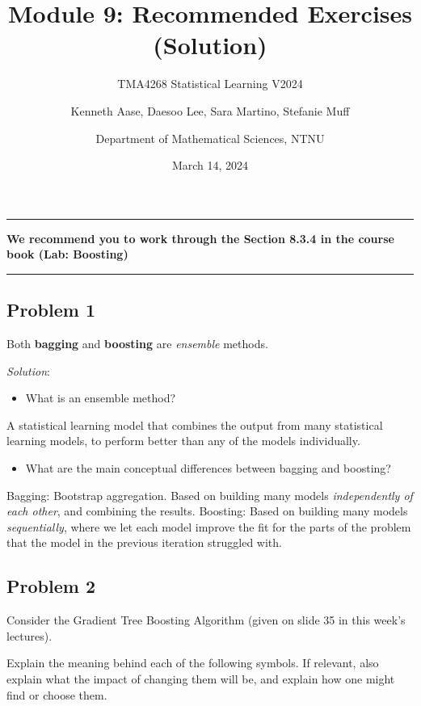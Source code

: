 \documentclass[
]{article}
\title{Module 9: Recommended Exercises (Solution)}
\subtitle{TMA4268 Statistical Learning V2024}
\author{Kenneth Aase, Daesoo Lee, Sara Martino, Stefanie
Muff \and Department of Mathematical Sciences, NTNU}
\date{March 14, 2024}
\providecommand{\tightlist}{%
  \setlength{\itemsep}{0pt}\setlength{\parskip}{0pt}}
\begin{document}
\maketitle

\begin{center}\rule{0.5\linewidth}{0.5pt}\end{center}

\textbf{We recommend you to work through the Section 8.3.4 in the course
book (Lab: Boosting)}

\begin{center}\rule{0.5\linewidth}{0.5pt}\end{center}

\hypertarget{problem-1}{%
\subsection{Problem 1}\label{problem-1}}

Both \textbf{bagging} and \textbf{boosting} are \emph{ensemble} methods.

\emph{Solution}:

\begin{itemize}
\tightlist
\item
  What is an ensemble method?
\end{itemize}

A statistical learning model that combines the output from many
statistical learning models, to perform better than any of the models
individually.

\begin{itemize}
\tightlist
\item
  What are the main conceptual differences between bagging and boosting?
\end{itemize}

Bagging: Bootstrap aggregation. Based on building many models
\emph{independently of each other}, and combining the results. Boosting:
Based on building many models \emph{sequentially}, where we let each
model improve the fit for the parts of the problem that the model in the
previous iteration struggled with.

\hypertarget{problem-2}{%
\subsection{Problem 2}\label{problem-2}}

Consider the Gradient Tree Boosting Algorithm (given on slide 35 in this
week's lectures).

Explain the meaning behind each of the following symbols. If relevant,
also explain what the impact of changing them will be, and explain how
one might find or choose them.
\end{document}
